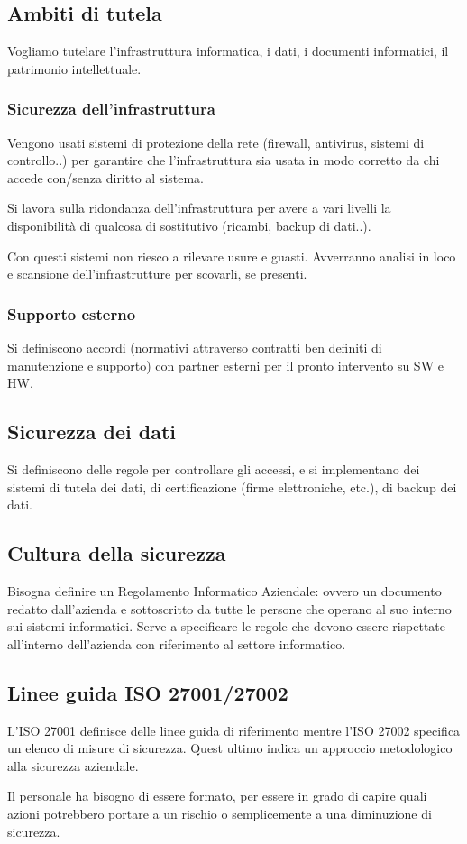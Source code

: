 \subsection{Ambiti di tutela}

Vogliamo tutelare l'infrastruttura informatica, i dati, i documenti
informatici, il patrimonio intellettuale.

\subsubsection{Sicurezza dell'infrastruttura}

Vengono usati sistemi di protezione della rete (firewall, antivirus,
sistemi di controllo..) per garantire che l'infrastruttura sia usata in
modo corretto da chi accede con/senza diritto al sistema.

Si lavora sulla ridondanza dell'infrastruttura per avere a vari livelli
la disponibilit\`a di qualcosa di sostitutivo (ricambi, backup di dati..).

Con questi sistemi non riesco a rilevare usure e guasti. Avverranno
analisi in loco e scansione dell'infrastrutture per scovarli, se
presenti.

\subsubsection{Supporto esterno}

Si definiscono accordi (normativi attraverso contratti ben definiti di
manutenzione e supporto) con partner esterni per il pronto intervento su
SW e HW.

\subsection{Sicurezza dei dati}

Si definiscono delle regole per controllare gli accessi, e si implementano dei
sistemi di tutela dei dati, di certificazione (firme elettroniche, etc.), di
backup dei dati.

\subsection{Cultura della sicurezza}

Bisogna definire un Regolamento Informatico Aziendale: ovvero un documento 
redatto dall'azienda e sottoscritto da tutte le persone che operano al suo 
interno sui sistemi informatici. Serve a specificare le regole che devono 
essere rispettate all'interno dell'azienda con riferimento al settore 
informatico.

\subsection{Linee guida ISO 27001/27002}

L'ISO 27001 definisce delle linee guida di riferimento mentre l'ISO 27002
specifica un elenco di misure di sicurezza. Quest ultimo indica un approccio 
metodologico alla sicurezza aziendale.

Il personale ha bisogno di essere formato, per essere in grado di capire quali
azioni potrebbero portare a un rischio o semplicemente a una diminuzione di 
sicurezza.

